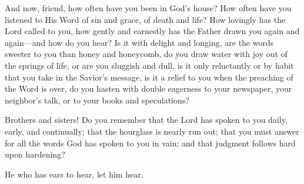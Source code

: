 And now, friend, how often have you been in God’s house? How often have you listened to His Word of sin and grace, of death and life? How lovingly has the Lord called to you, how gently and earnestly has the Father drawn you again and again—and how do you hear? Is it with delight and longing, are the words sweeter to you than honey and honeycomb, do you draw water with joy out of the springs of life, or are you sluggish and dull, is it only reluctantly or by habit that you take in the Savior’s message, is it a relief to you when the preaching of the Word is over, do you hasten with double eagerness to your newspaper, your neighbor’s talk, or to your books and speculations?

Brothers and sisters! Do you remember that the Lord has spoken to you daily, early, and continually; that the hourglass is nearly run out; that you must answer for all the words God has spoken to you in vain; and that judgment follows hard upon hardening?

He who has ears to hear, let him hear.




